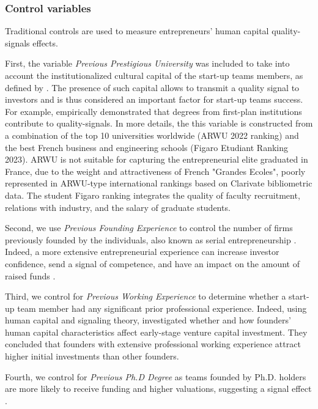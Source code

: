 \documentclass[12pt]{article}
\begin{document}
\subsubsection{Control variables}

Traditional controls are used to measure entrepreneurs' human capital quality-signals effects.

First, the variable \textit{Previous Prestigious University} was included to take into account the institutionalized cultural capital of the start-up teams members, as defined by \citet{bourdieu1979distinction}. The presence of such capital allows to transmit a quality signal to investors and is thus considered an important factor for start-up teams success. For example, \citet{ferrary1999confiance} empirically demonstrated that degrees from first-plan institutions contribute to quality-signals. In more details, the this variable is constructed from a combination of the top 10 universities worldwide (ARWU 2022 ranking) and the best French business and engineering schools (Figaro Etudiant Ranking 2023). ARWU is not suitable for capturing the entrepreneurial elite graduated in France, due to the weight and attractiveness of French "Grandes Ecoles", poorly represented in ARWU-type international rankings based on Clarivate bibliometric data. The student Figaro ranking integrates the quality of faculty recruitment, relations with industry, and the salary of graduate students.

Second, we use \textit{Previous Founding Experience} to control the number of firms previously founded by the individuals, also known as serial entrepreneurship \citep{kirschenhofer2012performance}. Indeed, a more extensive entrepreneurial experience can increase investor confidence, send a signal of competence, and have an impact on the amount of raised funds \citep{hsu2007experienced}.

Third, we control for \textit{Previous Working Experience} to determine whether a start-up team member had any significant prior professional experience. Indeed, using human capital and signaling theory, \citet{subramanian2022backing} investigated whether and how founders' human capital characteristics affect early-stage venture capital investment. They concluded that founders with extensive professional working experience attract higher initial investments than other founders.

Fourth, we control for \textit{Previous Ph.D Degree} as teams founded by Ph.D. holders are more likely to receive funding and higher valuations, suggesting a signal effect \citep{hsu2007experienced}.
\end{document}
